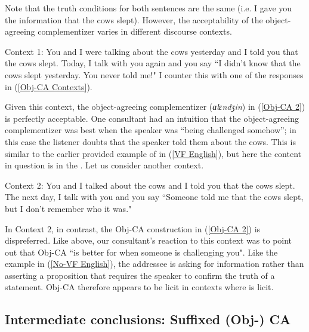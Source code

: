 \documentclass[output=paper
,newtxmath
,modfonts
,nonflat]{langsci/langscibook}
\begin{document}
\noindent Note that the truth conditions for both sentences are the same (i.e. I gave you the information that the cows slept). However, the acceptability of the object-agreeing complementizer varies in different discourse contexts.

\ea %
Context 1: You and I were talking about the cows yesterday and I told you that the cows slept. Today, I talk with you again and you say ``I didn't know that the cows slept yesterday. You never told me!" I counter this with one of the responses in (\ref{Obj-CA Contexts}).
\z

\noindent Given this context, the object-agreeing complementizer (\textit{ɑlɛndʒin}) in (\ref{Obj-CA 2}) is perfectly acceptable. One consultant had an intuition that the object-agreeing complementizer was best when the speaker was ``being challenged somehow''; in this case the listener doubts that the speaker told them about the cows. This is similar to the earlier provided example of  in (\ref{VF English}), but here the content in question is in the . Let us consider another context.

\ea %
Context 2: You and I talked about the cows and I told you that the cows slept. The next day, I talk with you and you say ``Someone told me that the cows slept, but I don't remember who it was."
\z

\noindent In Context 2, in contrast, the Obj-CA construction in (\ref{Obj-CA 2}) is dispreferred. Like above, our consultant's reaction to this context was to point out that Obj-CA ``is better for when someone is challenging you". Like the example in (\ref{No-VF English}), the addressee is asking for information rather than asserting a proposition that requires the speaker to confirm the truth of a statement. Obj-CA therefore appears to be licit in contexts where  is licit.


\subsection{Intermediate conclusions: Suffixed (Obj-) CA}
\end{document}
